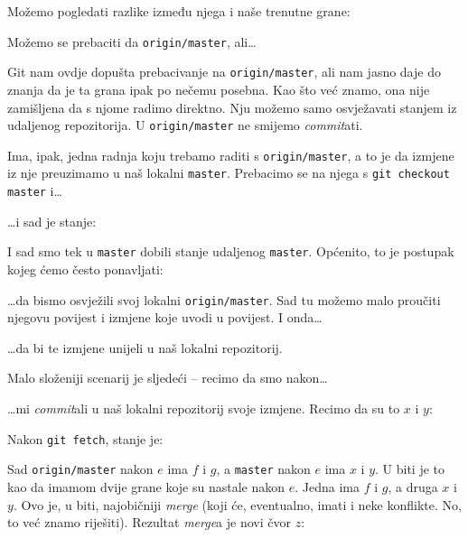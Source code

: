 
Možemo pogledati razlike između njega i naše trenutne grane:


Možemo se prebaciti da \verb+origin/master+, ali\dots



Git nam ovdje dopušta prebacivanje na \verb+origin/master+, ali nam jasno daje do znanja da je ta grana ipak po nečemu posebna.
Kao što već znamo, ona nije zamišljena da s njome radimo direktno.
Nju možemo samo osvježavati stanjem iz udaljenog repozitorija.
U \verb+origin/master+ ne smijemo \emph{commit}ati.

Ima, ipak, jedna radnja koju trebamo raditi s \verb+origin/master+, a to je da izmjene iz nje preuzimamo u naš lokalni \verb+master+.
Prebacimo se na njega s \verb+git checkout master+ i\dots{}


\dots{}i sad je stanje:



I sad smo tek u \verb+master+ dobili stanje udaljenog \verb+master+.
Općenito, to je postupak kojeg ćemo često ponavljati:


\dots{}da bismo osvježili svoj lokalni \verb+origin/master+.
Sad tu možemo malo proučiti njegovu povijest i izmjene koje uvodi u povijest.
I onda\dots


\dots{}da bi te izmjene unijeli u naš lokalni repozitorij.

Malo složeniji scenarij je sljedeći -- recimo da smo nakon\dots{}



\dots{}mi \emph{commit}ali u naš lokalni repozitorij svoje izmjene. Recimo da su to $x$ i $y$:



Nakon \verb+git fetch+, stanje je:



Sad \verb+origin/master+ nakon $e$ ima $f$ i $g$, a \verb+master+ nakon $e$ ima $x$ i $y$.
U biti je to kao da imamom dvije grane koje su nastale nakon $e$. Jedna ima $f$ i $g$, a druga $x$ i $y$.
Ovo je, u biti, najobičniji \emph{merge} (koji će, eventualno, imati i neke konflikte. No, to već znamo riješiti).
Rezultat \emph{merge}a je novi čvor $z$:

